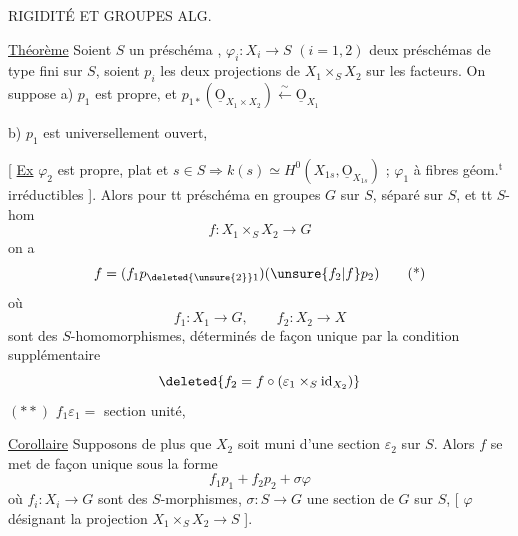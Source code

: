 RIGIDITÉ ET GROUPES ALG. 


\uline{Théorème} Soient $S$ un préschéma , $\varphi_i:X_i\longrightarrow S$ $(i=1,2)$ deux préschémas de type fini sur $S$,   soient $p_i$  les deux projections de $X_1\times_S X_2$ sur les facteurs. On suppose a) $p_1$ est propre, et $p_{1*}(\underline{\mathrm O}_{X_1\times X_2})\xleftarrow{\sim}\underline{\mathrm O}_{X_1}$


 b) $p_1$ est universellement ouvert, 

[ \uline{Ex} $\varphi_2$ est propre, plat et $s\in S\Rightarrow k(s)\simeq H^0(X_{1s},\underline{\mathrm O}_{X_{1s}})$ ;  $\varphi_1$  à fibres géom.$^{\mathrm t}$ irréductibles ]. Alors pour tt préschéma en groupes $G$ sur $S$, séparé sur $S$, et tt $S$-hom
\[
f:X_1\times_S X_2\longrightarrow G
\]
on a
\[
f=(f_1p_{\deleted{\unsure{2}}1})(\unsure{f_2|f}p_2)\tag*{(*)}
\]
où
\[
f_1:X_1\longrightarrow G,\qquad f_2:X_2\longrightarrow X
\]
sont des $S$-homomorphismes, déterminés de façon unique par la condition supplémentaire
\[
\deleted{f_2=f\circ(\varepsilon_1\times_S\operatorname{id}_{X_2})}
\]
\deleted{[ équivaut à :} $(**)$ \quad $f_1\varepsilon_1={}$ section unité, \deleted{pourvu que $\varphi_2$ soit un épim. ]} 

\uline{Corollaire} Supposons de plus que $X_2$ soit muni d'une section $\varepsilon_2$ sur $S$. Alors $f$ se met de façon unique sous la forme
\[
f_1p_1+f_2p_2+\sigma\varphi
\]
 où $f_i:X_i\longrightarrow G$ sont des $S$-morphismes, $\sigma:S\longrightarrow G$ une section de $G$ sur $S$, [ $\varphi$ désignant  la projection $X_1\times_S X_2\longrightarrow S$ ].

